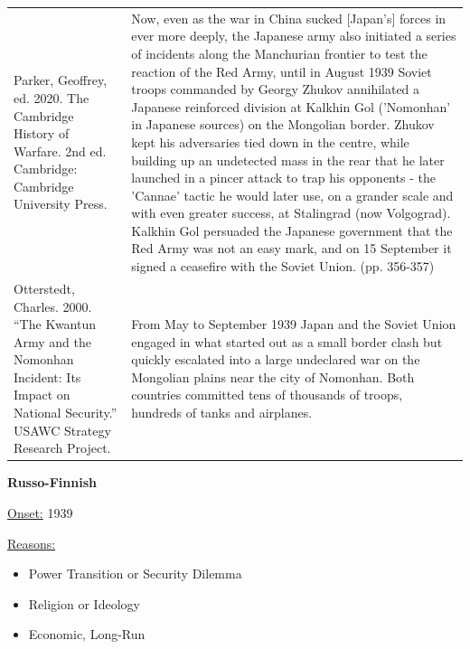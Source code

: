 {\begin{longtable}{p{}p{}}
Parker, Geoffrey, ed. 2020. The Cambridge History of Warfare. 2nd ed. Cambridge: Cambridge University Press. & Now, even as the war in China sucked [Japan's] forces in ever more deeply, the Japanese army also initiated a series of incidents along the Manchurian frontier to test the reaction of the Red Army, until in August 1939 Soviet troops commanded by Georgy Zhukov annihilated a Japanese reinforced division at Kalkhin Gol ('Nomonhan' in Japanese sources) on the Mongolian border. Zhukov kept his adversaries tied down in the centre, while building up an undetected mass in the rear that he later launched in a pincer attack to trap his opponents - the 'Cannae' tactic he would later use, on a grander scale and with even greater success, at Stalingrad (now Volgograd). Kalkhin Gol persuaded the Japanese government that the Red Army was not an easy mark, and on 15 September it signed a ceasefire with the Soviet Union. (pp. 356-357)
\\
Otterstedt, Charles. 2000. “The Kwantun Army and the Nomonhan Incident: Its Impact on National Security.” USAWC Strategy Research Project. & From May to September 1939 Japan and the Soviet Union engaged in what started out as a small border clash but quickly escalated into a large undeclared war on the Mongolian plains near the city of Nomonhan. Both countries committed tens of thousands of troops, hundreds of tanks and airplanes. 
\\
\end{longtable}}
\clearpage
         \textbf{Russo-Finnish} 

          \underline{Onset:} 1939         

\underline{Reasons:}
\begin{itemize}
\item Power Transition or Security Dilemma
\item Religion or Ideology
\item Economic, Long-Run
\end{itemize}

